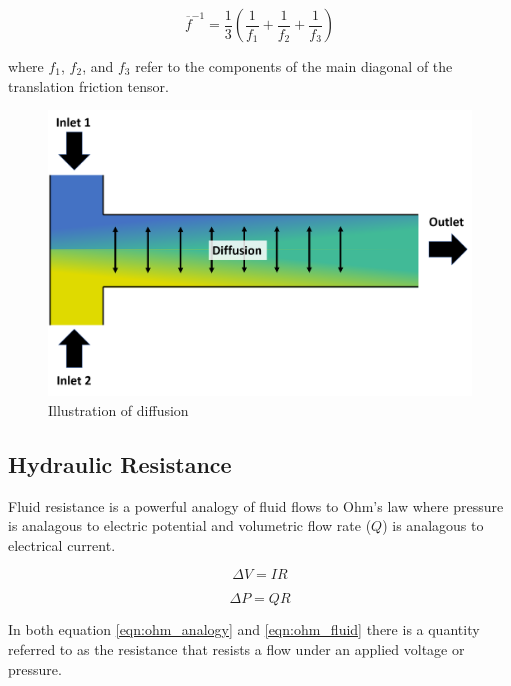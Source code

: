 \begin{equation}
    \overline{f}^{-1} = \frac{1}{3}(\frac{1}{f_1} + \frac{1}{f_2} + \frac{1}{f_3})
\end{equation}

\noindent where $f_1$, $f_2$, and $f_3$ refer to the components of the main diagonal of the translation friction tensor. 

\begin{figure}[ht]
    \centering
    \includegraphics[width=\textwidth]{images/diffusion_illustration.png}
    \caption{Illustration of diffusion}
    \label{fig:diffusion_ilustration}
\end{figure} 


\subsection*{Hydraulic Resistance}

\par Fluid resistance is a powerful analogy of fluid flows to Ohm's law where pressure is analagous to electric potential and volumetric flow rate ($Q$) is analagous to electrical current. 

\begin{equation}
    \Delta V = I R
    \label{eqn:ohm_analogy}
\end{equation}

\begin{equation}
    \Delta P = Q R
    \label{eqn:ohm_fluid}
\end{equation}

\noindent In both equation \ref{eqn:ohm_analogy} and \ref{eqn:ohm_fluid} there is a quantity referred to as the resistance that resists a flow under an applied voltage or pressure. 

